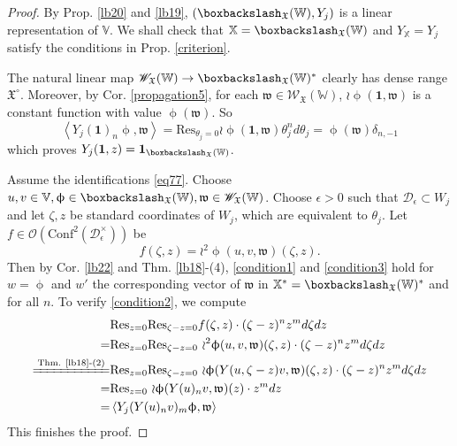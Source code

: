 \documentclass[11pt,b5paper,notitlepage]{article}
\theoremstyle{definition}
\theoremstyle{plain}
\newcommand{\fk}{\mathfrak}
\newcommand{\Conf}{\mathrm{Conf}}
\newcommand{\Res}{\mathrm{Res}}
\newcommand{\scr}{\mathscr}
\newcommand{\Vbb}{\mathbb V}
\newcommand{\Xbb}{\mathbb X}
\newcommand{\Wbb}{\mathbb W}
\newcommand{\ibf}{\mathbf 1}
\newcommand{\<}{\left\langle}
\renewcommand{\>}{\right\rangle}
\newcommand{\MO}{\mathcal{O}}
\newcommand{\fx}{\mathfrak{X}}
\newcommand{\MD}{\mathcal{D}}
\newcommand{\bbs}{\boxbackslash}
\numberwithin{equation}{subsection}
\begin{document}
\begin{proof}
By Prop. \ref{lb20} and \ref{lb19},  $(\boxbackslash_{\fx}(\Wbb),Y_j)$ is a linear representation of $\Vbb$. We shall check that $\Xbb=\bbs_\fx(\Wbb)$ and $Y_\Xbb=Y_j$ satisfy the conditions in Prop. \ref{criterion}.
     
The natural linear map $\scr W_{\fk X}(\Wbb)\rightarrow \boxbackslash_\fx(\Wbb)^*$ clearly has dense range $\fk X^\circ$. Moreover, by Cor. \ref{propagation5}, for each $\fk w\in\scr W_{\fk X}(\Wbb)$, $\wr\upphi(\ibf,\fk w)$ is a constant function with value $\upphi(\fk w)$. So 
    $$
    \<Y_j(\ibf)_n\upphi,\fk w\>=\Res_{\theta_j=0}\wr\upphi(\ibf,\fk w)\theta_j^n d\theta_j=\upphi(\fk w)\delta_{n,-1}
    $$
    which proves $Y_j(\ibf,z)=\ibf_{\boxbackslash_\fx(\Wbb)}$.
     
Assume the identifications \eqref{eq77}.  Choose $u,v\in \Vbb,\upphi\in \boxbackslash_\fx(\Wbb),\fk w\in \scr W_\fx(\Wbb)$. Choose $\epsilon>0$ such that $\MD_\epsilon\subset W_j$ and let $\zeta,z$ be standard coordinates of $W_j$, which are equivalent to $\theta_j$. Let $f\in \MO(\Conf^2(\MD_\epsilon^\times))$ be 
    $$
    f(\zeta,z)=\wr^2\upphi(u,v,\fk w)(\zeta,z).
    $$
Then by Cor. \ref{lb22} and Thm. \ref{lb18}-(4), \eqref{condition1} and \eqref{condition3} hold for $w=\upphi$ and $w'$ the corresponding vector of $\fk w$ in $\Xbb^*=\bbs_\fx(\Wbb)^*$ and for all $n$. To verify \eqref{condition2}, we compute  
\begin{align*}
 &\Res_{z=0}\Res_{\zeta-z=0}f(\zeta,z)\cdot (\zeta-z)^n z^m d\zeta dz\\
    =&\Res_{z=0}\Res_{\zeta-z=0}~{\wr^2\upphi}(u,v,\fk w)(\zeta,z)\cdot (\zeta-z)^n z^m d\zeta dz\\
\xlongequal{\text{Thm. \ref{lb18}-(2)}}&\Res_{z=0}\Res_{\zeta-z=0}~{\wr\upphi}(Y(u,\zeta-z)v,\fk w)(\zeta,z)\cdot (\zeta-z)^n z^m d\zeta dz\\
    =&\Res_{z=0}~{\wr\upphi}(Y(u)_nv,\fk w)(z)\cdot  z^m  dz\\
    =&\<Y_j(Y(u)_n v)_m\upphi,\fk w\>
\end{align*}
This finishes the proof.
\end{proof}
\end{document}
